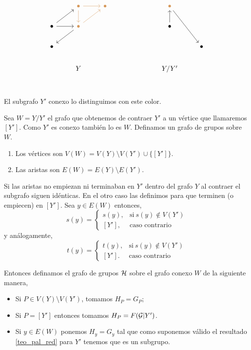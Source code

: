 \documentclass[tesis.tex]{subfiles}
\begin{document}
\[\begin{tikzcd}
	& \color{rgb,255:red,214;green,153;blue,92}\bullet &  \color{rgb,255:red,214;green,153;blue,92} \bullet &&&  \color{rgb,255:red,214;green,153;blue,92} \bullet \\
	\bullet & \color{rgb,255:red,214;green,153;blue,92} \bullet &&&& \bullet \\
	\bullet &&&&&& \bullet \\
	& Y &&&& Y/Y' \\ 	
	\arrow[color={rgb,255:red,214;green,153;blue,92}, from=1-2, to=1-3]
	\arrow[color={rgb,255:red,214;green,153;blue,92}, from=1-2, to=2-2]
	\arrow[color={rgb,255:red,214;green,153;blue,92}, from=2-2, to=1-3]
	\arrow[from=2-1, to=1-2]
	\arrow[from=2-1, to=2-2]
	\arrow[from=2-2, to=3-1]
	\arrow[from=1-6, to=3-7]
	\arrow[from=2-6, to=1-6]
\end{tikzcd}\]
El subgrafo $Y'$ conexo lo distinguimos con este \textcolor{rgb,255:red,214;green,153;blue,92}{color}.

Sea $W = Y / Y'$  el grafo que obtenemos de contraer $Y'$ a un vértice que llamaremos $[Y']$. 
Como $Y'$ es conexo también lo es $W$.
Definamos un grafo de grupos sobre $W$.

\begin{enumerate}
	\item Los vértices son $V(W)= V(Y) \setminus V(Y') \cup \{ [Y'] \}$.
	\item Las aristas son $E(W) = E(Y) \setminus E(Y')$.
\end{enumerate}

Si las aristas no empiezan ni terminaban en $Y'$ dentro del grafo $Y$ al contraer el subgrafo siguen idénticas. 
En el otro caso las definimos para que terminen (o empiecen) en $[Y']$. Sea $y \in E(W)$ entonces,
\begin{equation*}
	s(y) = 
	\begin{cases}
	s(y),  & \text{si} \ s(y) \notin V(Y') \\ 
	[Y'], & \text{caso contrario}
	\end{cases}
\end{equation*}
y análogamente,
\begin{equation*}
	t(y) = 
	\begin{cases}
		t(y),  & \text{si} \ s(y) \notin V(Y') \\ 
		[Y']. & \text{caso contrario}
	\end{cases}
\end{equation*}


Entonces definamos el grafo de grupos $\cal H$ sobre el grafo conexo $W$ de la siguiente manera,
\begin{itemize}
	\item Si $P \in V(Y) \setminus V(Y')$, tomamos $H_P = G_P$;
	\item Si $P = [Y']$ entonces tomamos $H_P = F({\cal G} | Y')$.
	\item Si $y \in E(W)$ ponemos $H_y = G_y$ tal que como suponemos válido el resultado \ref{teo_pal_red} para $Y'$ tenemos que es un subgrupo.
\end{itemize}
\end{document}
